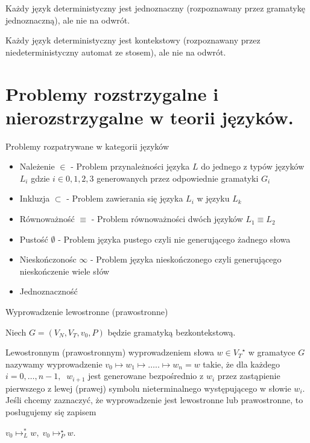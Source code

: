 \documentclass[main.tex]{subfiles}
\begin{document}
    \begin{theorem}
        Każdy język deterministyczny jest jednoznaczny (rozpoznawany przez gramatykę jednoznaczną), ale nie na odwrót.
    \end{theorem}

    \begin{theorem}
        Każdy język deterministyczny jest kontekstowy (rozpoznawany przez niedeterministyczny automat ze stosem), ale nie na odwrót.
    \end{theorem}

    \newpage

    \section{Problemy rozstrzygalne i nierozstrzygalne w teorii języków.}

    Problemy rozpatrywane w kategorii języków
    \begin{itemize}
        \item Należenie $\in$ - Problem przynależności języka $L$ do jednego z typów języków $L_i$ gdzie $i \in {0,1,2,3}$ generowanych przez odpowiednie gramatyki  $G_i$
        \item Inkluzja $\subset$ - Problem zawierania się języka $L_i$ w języku $L_k$
        \item Równoważność $\equiv$ - Problem równoważności dwóch języków $L_1 \equiv L_2$
        \item Pustość $\emptyset$ - Problem języka pustego czyli nie generującego żadnego słowa
        \item Nieskończonośc $\infty$ - Problem języka nieskończonego czyli generującego nieskończenie wiele słów
        \item Jednoznaczność
    \end{itemize}

    \begin{definition}
        Wyprowadzenie lewostronne (prawostronne)

        Niech $G = (V_N,V_T,v_0,P)$ będzie gramatyką bezkontekstową.

        Lewostronnym (prawostronnym) wyprowadzeniem słowa $w \in {V_T}^\star$ w gramatyce $G$ nazywamy wyprowadzenie
        $v_0 \mapsto w_1 \mapsto \ldots.. \mapsto w_n = w$
        takie, że dla każdego $i=0,\ldots,n-1, \;\; w_{i+1}$ jest generowane bezpośrednio z $w_i$ przez zastąpienie pierwszego z lewej (prawej) symbolu nieterminalnego występującego w słowie $w_i$.
        Jeśli chcemy zaznaczyć, że wyprowadzenie jest lewostronne lub prawostronne, to posługujemy się zapisem

        $v_{0}\mapsto_{L}^{*}w,\; v_{0}\mapsto_{P}^{\star}w$.
    \end{definition}
\end{document}
